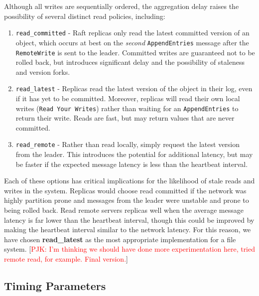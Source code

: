 \documentclass[10pt,conference,letterpaper]{IEEEtran}
\newcommand{\todo}[1]{{\textcolor{red}{#1}}}
\newcommand{\pjk}[1]{[\todo{PJK: #1}]}
\begin{document}
Although all writes are sequentially ordered, the aggregation delay raises the possibility
of several distinct read policies, including:
\begin{enumerate}
    \item \texttt{read\_committed} - Raft replicas only read the latest committed version
of an object, which occurs at best on the \emph{second} \texttt{AppendEntries} message
after the \texttt{RemoteWrite} is sent to the leader. Committed writes are guaranteed not
to be rolled back, but introduces significant delay and the possibility of staleness and
version forks. 
    \item \texttt{read\_latest} - Replicas read the latest version of the object
in their log, even if it has yet to be committed.
Moreover, replicas will read their own local writes (\texttt{Read Your Writes}) rather than waiting for an
\texttt{AppendEntries} to return their write. Reads are fast, but may return values that
are never committed.
    \item \texttt{read\_remote} - Rather than read locally, simply request the latest
version from the leader.
This introduces the potential for additional latency, but may be faster if the expected
message latency is less than the heartbeat interval.
\end{enumerate}

Each of these options has critical implications for the likelihood of stale reads and
writes in the system.
Replicas would choose read committed if the network was highly partition prone and
messages from the leader were unstable and prone to being rolled back.
Read remote servers replicas well when the average message latency is far lower than the
heartbeat interval, though this could be improved by making the heartbeat interval similar
to the network latency.
For this reason, we have chosen \textbf{read\_latest} as the most appropriate implementation for a file
system.
\pjk{I'm thinking we should have done more experimentation here, tried remote read, for
  example. Final version.}

\subsection{Timing Parameters}
\end{document}
